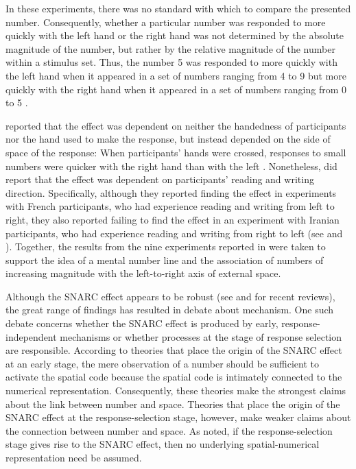 \documentclass[man,floatsintext]{apa6}
\theoremstyle{definition}
\theoremstyle{definition}
\theoremstyle{definition}
\theoremstyle{remark}
\begin{document}
In these experiments, there was no standard with which to compare the
presented number. Consequently, whether a particular number was
responded to more quickly with the left hand or the right hand was not
determined by the absolute magnitude of the number, but rather by the
relative magnitude of the number within a stimulus set. Thus, the number
5 was responded to more quickly with the left hand when it appeared in a
set of numbers ranging from 4 to 9 but more quickly with the right hand
when it appeared in a set of numbers ranging from 0 to 5
\autocites[e.g.,][]{Dehaene:1993fc}{Fias:1996ms}.

\textcite{Dehaene:1993fc} reported that the effect was dependent on
neither the handedness of participants nor the hand used to make the
response, but instead depended on the side of space of the response:
When participants' hands were crossed, responses to small numbers were
quicker with the right hand than with the left \autocite[however,
see,][]{Woods:2006cp}. Nonetheless, \textcite{Dehaene:1993fc} did report
that the effect was dependent on participants' reading and writing
direction. Specifically, although they reported finding the effect in
experiments with French participants, who had experience reading and
writing from left to right, they also reported failing to find the
effect in an experiment with Iranian participants, who had experience
reading and writing from right to left (see \textcite{Shaki:2009ch} and
\textcite{Zebine}). Together, the results from the nine experiments
reported in \textcite{Dehaene:1993fc} were taken to support the idea of
a mental number line and the association of numbers of increasing
magnitude with the left-to-right axis of external space.

Although the SNARC effect appears to be robust (see
\textcite{Wood:2008rev} and \textcite{Toomarian:2018rev} for recent
reviews), the great range of findings has resulted in debate about
mechanism. One such debate concerns whether the SNARC effect is produced
by early, response-independent mechanisms or whether processes at the
stage of response selection are responsible. According to theories that
place the origin of the SNARC effect at an early stage, the mere
observation of a number should be sufficient to activate the spatial
code because the spatial code is intimately connected to the numerical
representation. Consequently, these theories make the strongest claims
about the link between number and space. Theories that place the origin
of the SNARC effect at the response-selection stage, however, make
weaker claims about the connection between number and space. As
\textcite{PecherBoot:2011} noted, if the response-selection stage gives
rise to the SNARC effect, then no underlying spatial-numerical
representation need be assumed.
\end{document}
